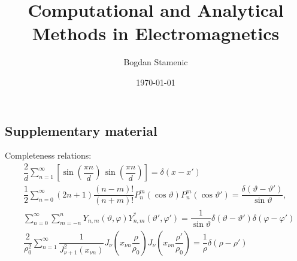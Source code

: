 

\newcommand{\FormelsammlungTitel}{Computational and Analytical Methods in Electromagnetics}
\newcommand{\FormelsammlungAutor}{Bogdan Stamenic}
\setcounter{tocdepth}{2} %


	\title{\FormelsammlungTitel}
	\author{\FormelsammlungAutor}
	\date{\today}
	\begin{multicols*}{3}
			\maketitle
			\tableofcontents
		
		
		
		
		
		
		
		
		\section{Supplementary material}
		Completeness relations:
		\begin{align*}
          &\dfrac{2}{d} \sum\limits_{n=1}^{\infty}\left[\sin\left(\dfrac{\pi n}{d}\right) \, \sin\left(\dfrac{\pi n}{d}\right) \right] = \delta(x - x')\\
		  &\dfrac{1}{2}\sum\limits_{n=0}^{\infty}(2n+1)\dfrac{(n-m)!}{(n+m)!} P_{n}^{m}(\cos\vartheta)P_{n}^{m}(\cos\vartheta') = \dfrac{\delta(\vartheta - \vartheta')}{\sin\vartheta},\\
		  &\sum\limits_{n=0}^{\infty}\sum\limits_{m=-n}^{n}Y_{n,m}(\vartheta,\varphi) Y_{n,m}^{*}(\vartheta',\varphi') = \dfrac{1}{\sin\vartheta}\delta(\vartheta-\vartheta')\delta(\varphi-\varphi')\\
		  &\dfrac{2}{\rho_{0}^{2}}\sum\limits_{n=1}^{\infty} \dfrac{1}{J_{\nu+1}^{2}(x_{\nu n})} J_{\nu}\left(x_{\nu n}\dfrac{\rho}{\rho_{0}}\right) J_{\nu}\left(x_{\nu n}\dfrac{\rho'}{\rho_{0}}\right)
			= \dfrac{1}{\rho} \delta(\rho - \rho')
		\end{align*}
	\end{multicols*}

